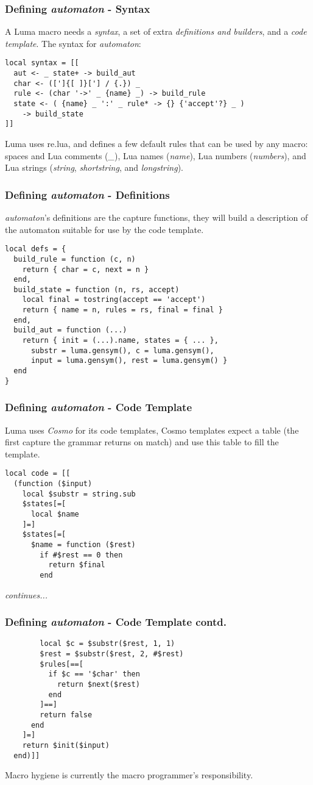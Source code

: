 \documentclass{beamer}
\begin{document}
\begin{frame}[fragile]
\frametitle{Defining \emph{automaton} - Syntax}
A Luma macro needs a \emph{syntax}, a set of extra \emph{definitions and builders}, and
a \emph{code template}. The syntax for \emph{automaton}:
\begin{verbatim}
local syntax = [[
  aut <- _ state+ -> build_aut
  char <- ([']{[ ]}['] / {.}) _
  rule <- (char '->' _ {name} _) -> build_rule 
  state <- ( {name} _ ':' _ rule* -> {} {'accept'?} _ ) 
    -> build_state
]]
\end{verbatim}
Luma uses re.lua, and defines a few default rules that can be used by
any macro: spaces and Lua comments (\emph{\_}), Lua names (\emph{name}),
Lua numbers (\emph{numbers}), and Lua strings (\emph{string}, \emph{shortstring},
and \emph{longstring}).
\end{frame}

\begin{frame}[fragile]
\frametitle{Defining \emph{automaton} - Definitions}
\emph{automaton}'s definitions are the capture functions, they will build a description
of the automaton suitable for use by the code template.
\begin{verbatim}
local defs = {
  build_rule = function (c, n)
    return { char = c, next = n }
  end,
  build_state = function (n, rs, accept)
    local final = tostring(accept == 'accept')
    return { name = n, rules = rs, final = final }
  end,
  build_aut = function (...)
    return { init = (...).name, states = { ... }, 
      substr = luma.gensym(), c = luma.gensym(),
      input = luma.gensym(), rest = luma.gensym() }
  end
}
\end{verbatim}
\end{frame}

\begin{frame}[fragile]
\frametitle{Defining \emph{automaton} - Code Template}
Luma uses \emph{Cosmo} for its code templates, Cosmo templates expect a table (the first
capture the grammar returns on match) and use this table to fill the template.
\begin{verbatim}
local code = [[
  (function ($input)
    local $substr = string.sub
    $states[=[
      local $name
    ]=]
    $states[=[
      $name = function ($rest)
        if #$rest == 0 then
          return $final
        end
\end{verbatim}
\emph{continues...}
\end{frame}

\begin{frame}[fragile]
\frametitle{Defining \emph{automaton} - Code Template contd.}
\begin{verbatim}
        local $c = $substr($rest, 1, 1)
        $rest = $substr($rest, 2, #$rest)
        $rules[==[
          if $c == '$char' then
            return $next($rest)
          end
        ]==]
        return false
      end
    ]=]
    return $init($input)
  end)]]
\end{verbatim}
Macro hygiene is currently the macro programmer's responsibility.
\end{frame}
\end{document}
